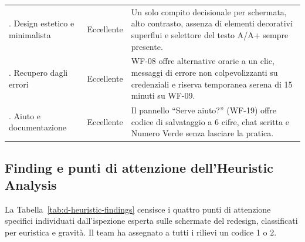 \begin{center}
\begin{longtable}{@{}
  >{\raggedright\arraybackslash}p{}
  >{\centering\arraybackslash}p{}
  >{\raggedright\arraybackslash}p{}@{}}
8. Design estetico e minimalista & Eccellente & Un solo compito decisionale per schermata, alto contrasto, assenza di elementi decorativi superflui e selettore del testo A/A+ sempre presente. \\
9. Recupero dagli errori & Eccellente & WF-08 offre alternative orarie a un clic, messaggi di errore non colpevolizzanti su credenziali e riserva temporanea serena di 15 minuti su WF-09. \\
10. Aiuto e documentazione & Eccellente & Il pannello ``Serve aiuto?'' (WF-19) offre codice di salvataggio a 6 cifre, chat scritta e Numero Verde senza lasciare la pratica. \\
\end{longtable}
\end{center}

\subsection{Finding e punti di attenzione dell'Heuristic Analysis}

La Tabella~\ref{tab:d-heuristic-findings} censisce i quattro punti di attenzione specifici individuati dall'ispezione esperta sulle schermate del redesign, classificati per euristica e gravità. Il team ha assegnato a tutti i rilievi un codice 1 o 2.

